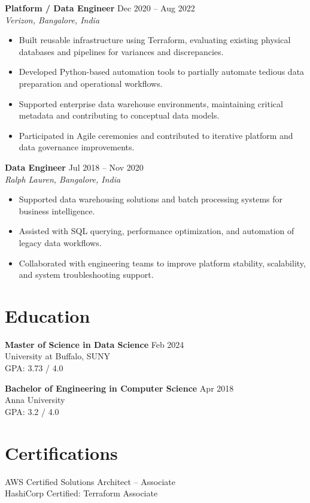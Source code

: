 \documentclass[10pt]{article}
\begin{document}
\textbf{Platform / Data Engineer} \hfill Dec 2020 -- Aug 2022 \\ %
\textit{Verizon, Bangalore, India}
\begin{itemize}[leftmargin=*, itemsep=3pt]
    \item Built reusable infrastructure using Terraform, evaluating existing physical databases and pipelines for variances and discrepancies. %
    \item Developed Python-based automation tools to partially automate tedious data preparation and operational workflows. %
    \item Supported enterprise data warehouse environments, maintaining critical metadata and contributing to conceptual data models. %
    \item Participated in Agile ceremonies and contributed to iterative platform and data governance improvements. %
\end{itemize}

\textbf{Data Engineer} \hfill Jul 2018 -- Nov 2020 \\ %
\textit{Ralph Lauren, Bangalore, India}
\begin{itemize}[leftmargin=*, itemsep=3pt]
    \item Supported data warehousing solutions and batch processing systems for business intelligence. %
    \item Assisted with SQL querying, performance optimization, and automation of legacy data workflows. %
    \item Collaborated with engineering teams to improve platform stability, scalability, and system troubleshooting support. %
\end{itemize}

\section*{Education}

\textbf{Master of Science in Data Science} \hfill Feb 2024 \\
University at Buffalo, SUNY \\
GPA: 3.73 / 4.0

\textbf{Bachelor of Engineering in Computer Science} \hfill Apr 2018 \\
Anna University \\
GPA: 3.2 / 4.0

\section*{Certifications}
AWS Certified Solutions Architect – Associate \\
HashiCorp Certified: Terraform Associate
\end{document}
